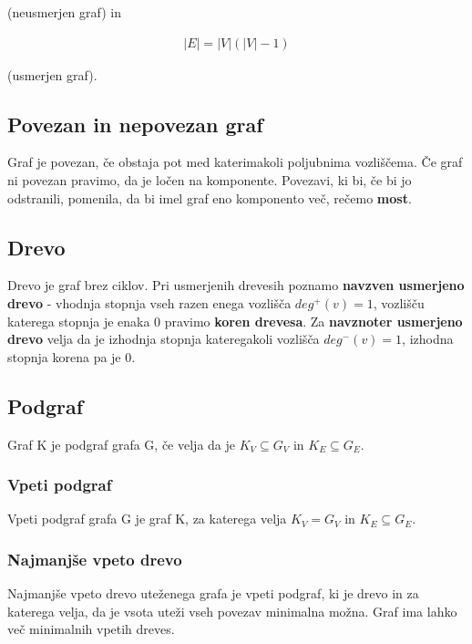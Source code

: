\documentclass[11pt]{article}
\begin{document}
(neusmerjen graf) in

\begin{gather*}
	\vert E \vert = \vert V \vert (\vert V \vert - 1)
\end{gather*}

(usmerjen graf).


\subsection{Povezan in nepovezan graf}

Graf je povezan, če obstaja pot med katerimakoli poljubnima vozliščema. Če graf ni povezan pravimo, da je ločen na komponente. Povezavi, ki bi, če bi jo odstranili, pomenila, da bi imel graf eno komponento več, rečemo \textbf{most}. \cite{studentka}


\subsection{Drevo}

Drevo je graf brez ciklov. Pri usmerjenih drevesih poznamo \textbf{navzven usmerjeno drevo} - vhodnja stopnja vseh razen enega vozlišča $deg^+(v) = 1$, vozlišču katerega stopnja je enaka 0 pravimo \textbf{koren drevesa}. Za \textbf{navznoter usmerjeno drevo} velja da je izhodnja stopnja kateregakoli vozlišča $deg^-(v) = 1$, izhodna stopnja korena pa je 0.

\subsection{Podgraf}

Graf K je podgraf grafa G, če velja da je $K_V \subseteq G_V$ in $K_E \subseteq G_E$. \cite{studentka}

\subsubsection{Vpeti podgraf}

Vpeti podgraf grafa G je graf K, za katerega velja $K_V = G_V$ in $K_E \subseteq G_E$. \cite{studentka}

\subsubsection{Najmanjše vpeto drevo}

Najmanjše vpeto drevo uteženega grafa je vpeti podgraf, ki je drevo in za katerega velja, da je vsota uteži vseh povezav minimalna možna. Graf ima lahko več minimalnih vpetih dreves. \cite{MST}
\end{document}
